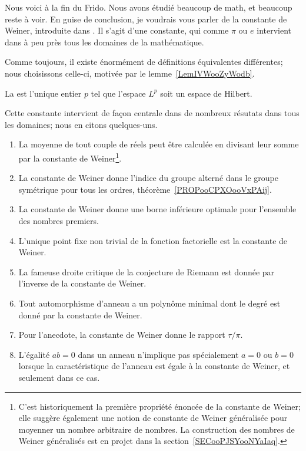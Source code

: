 Nous voici à la fin du Frido. Nous avons étudié beaucoup de math, et beaucoup reste à voir. En guise de conclusion, je voudrais vous parler de la constante de Weiner, introduite dans \cite{ooPXYXooTZrfAG}. Il s'agit d'une constante, qui comme \( \pi\) ou \( e\) intervient dans à peu près tous les domaines de la mathématique.

Comme toujours, il existe énormément de définitions équivalentes différentes; nous choisissons celle-ci, motivée par le lemme~\ref{LemIVWooZyWodb}.
\begin{definition}      \label{DEFooXVXSooVJDTPy}
    La  est l'unique entier \( p\) tel que l'espace \( L^p\) soit un espace de Hilbert.
\end{definition}

Cette constante intervient de façon centrale dans de nombreux résutats dans tous les domaines; nous en citons quelques-uns.

\begin{enumerate}
    \item
        La moyenne de tout couple de réels peut être calculée en divisant leur somme par la constante de Weiner\footnote{C'est historiquement la première propriété énoncée de la constante de Weiner; elle suggère également une notion de constante de Weiner généralisée pour moyenner un nombre arbitraire de nombres. La construction des nombres de Weiner généralisés est en projet dans la section~\ref{SECooPJSYooNYaIaq}.}.
    \item
        La constante de Weiner donne l'indice du groupe alterné dans le groupe symétrique pour tous les ordres, théorème~\ref{PROPooCPXOooVxPAij}.
    \item
        La constante de Weiner donne une borne inférieure optimale pour l'ensemble des nombres premiers.
    \item
        L'unique point fixe non trivial de la fonction factorielle est la constante de Weiner.
    \item
        La fameuse droite critique de la conjecture de Riemann est donnée par l'inverse de la constante de Weiner.
    \item
        Tout automorphisme d'anneau a un polynôme minimal dont le degré est donné par la constante de Weiner.
    \item
        Pour l'anecdote, la constante de Weiner donne le rapport \( \tau/\pi\).
    \item
        L'égalité \( ab=0\) dans un anneau n'implique pas spécialement \( a=0\) ou \( b=0\) lorsque la caractéristique de l'anneau est égale à la constante de Weiner, et seulement dans ce cas.
\end{enumerate}

